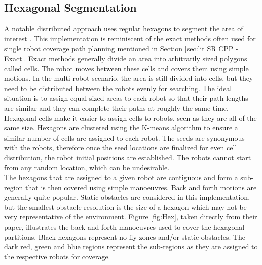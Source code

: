 	\subsection{Hexagonal Segmentation}
	A notable distributed approach uses regular hexagons to segment the area of interest \cite{Azpurua2018}. This implementation is reminiscent of the exact methods often used for single robot coverage path planning mentioned in Section \ref{sec:lit SR CPP - Exact}. Exact methods generally divide an area into arbitrarily sized polygons called cells. The robot moves between these cells and covers them using simple motions. In the multi-robot scenario, the area is still divided into cells, but they need to be distributed between the robots evenly for searching. The ideal situation is to assign equal sized areas to each robot so that their path lengths are similar and they can complete their paths at roughly the same time.\\
	Hexagonal cells make it easier to assign cells to robots, seen as they are all of the same size. Hexagons are clustered using the K-means algorithm to ensure a similar number of cells are assigned to each robot. The seeds are synonymous with the robots, therefore once the seed locations are finalized for even cell distribution, the robot initial positions are established. The robots cannot start from any random location, which can be undesirable. \\
	The hexagons that are assigned to a given robot are contiguous and form a sub-region that is then covered using simple manoeuvres. Back and forth motions are generally quite popular. Static obstacles are considered in this implementation, but the smallest obstacle resolution is the size of a hexagon which may not be very representative of the environment. Figure \ref{fig:Hex}, taken directly from their paper, illustrates the back and forth manoeuvres used to cover the hexagonal partitions. Black hexagons represent no-fly zones and/or static obstacles. The dark red, green and blue regions represent the sub-regions as they are assigned to the respective robots for coverage.\\
